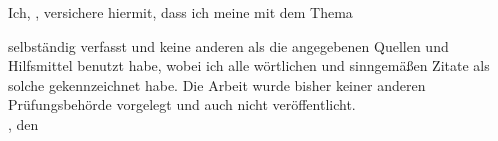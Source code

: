 \clearpage
{}


Ich, \autorName, versichere hiermit, dass ich meine \textbf{\betreff} mit dem
Thema
\begin{quote}
\textit{\kompletterTitel}
\end{quote}
selbständig verfasst und keine anderen als die angegebenen Quellen und Hilfsmittel benutzt habe,
wobei ich alle wörtlichen und sinngemäßen Zitate als solche gekennzeichnet habe. Die Arbeit
wurde bisher keiner anderen Prüfungsbehörde vorgelegt und auch nicht veröffentlicht.\\[6ex]

\abgabeOrt, den \abgabeTermin


\textsc{\autorName}

